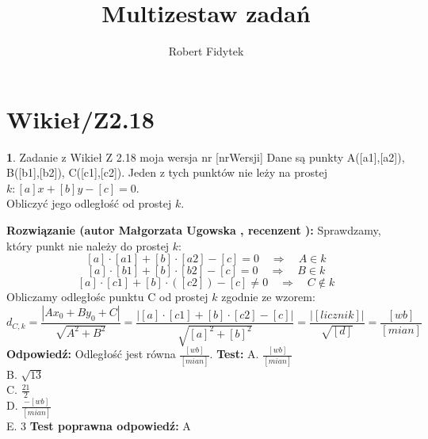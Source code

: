 \documentclass[12pt, a4paper]{article}
\title{Multizestaw zadań}
\author{Robert Fidytek}
\date{}
\theoremstyle{definition} %
\newtheorem{zad}{}
\newcommand{\kategoria}[1]{\section{#1}} %
\newcommand{\zadStart}[1]{\begin{zad}#1\newline} %
\newcommand{\zadStop}{\end{zad}}   %
\newcommand{\rozwStart}[2]{\noindent \textbf{Rozwiązanie (autor #1 , recenzent #2): }\newline} %
\newcommand{\rozwStop}{\newline}                                            %
\newcommand{\odpStart}{\noindent \textbf{Odpowiedź:}\newline}    %
\newcommand{\odpStop}{\newline}                                             %
\newcommand{\testStart}{\noindent \textbf{Test:}\newline} %
\newcommand{\testStop}{\newline} %
\newcommand{\kluczStart}{\noindent \textbf{Test poprawna odpowiedź:}\newline} %
\newcommand{\kluczStop}{\newline} %
\begin{document}
\maketitle


\kategoria{Wikieł/Z2.18}
\zadStart{Zadanie z Wikieł Z 2.18 moja wersja nr [nrWersji]}
Dane są punkty A([a1],[a2]), B([b1],[b2]), C([c1],[c2]). Jeden z tych punktów nie leży na prostej $k: [a]x+[b]y-[c]=0$. \\Obliczyć jego odległość od prostej $k$.
\zadStop
\rozwStart{Małgorzata Ugowska}{}
Sprawdzamy, który punkt nie należy do prostej $k$:
$$[a] \cdot [a1]+[b] \cdot [a2]-[c]=0 \quad \Longrightarrow \quad A \in k$$
$$[a] \cdot [b1]+[b] \cdot [b2]-[c]=0 \quad \Longrightarrow \quad B \in k$$
$$[a] \cdot [c1]+[b] \cdot ([c2])-[c] \ne 0 \quad \Longrightarrow \quad C \notin k$$
Obliczamy odległo\'sc punktu C od prostej $k$ zgodnie ze wzorem:
$$d_{C,k}=\frac{|A x_0+ B y_0 +C|}{\sqrt{A^2+B^2}} = \frac{|[a] \cdot [c1]+ [b] \cdot [c2] - [c]|}{\sqrt{[a]^2+[b]^2}} = \frac{|[licznik]|}{\sqrt{[d]}} = \frac{[wb]}{[mian]}$$
\rozwStop
\odpStart
Odległo\'sć jest równa $\frac{[wb]}{[mian]}$.
\odpStop
\testStart
A. $\frac{[wb]}{[mian]}$\\
B. $\sqrt{13}$\\
C. $\frac{21}{2}$\\
D. $\frac{-[wb]}{[mian]}$\\
E. $3$
\testStop
\kluczStart
A
\kluczStop
\end{document}
